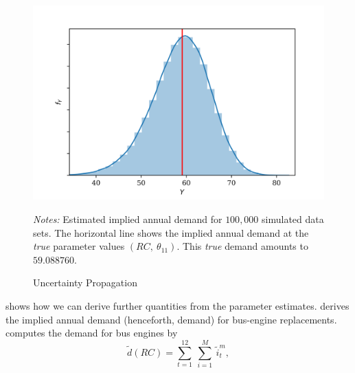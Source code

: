 \begin{figure}[t]
	\caption{Uncertainty Propagation}
    \label{uncertainty}
	\vspace*{-4mm}
	\begin{centering}
		\includegraphics[scale=0.9]{../figures/uncertainty_propagation_100000.png}
	\end{centering}

	\small
	\textit{Notes:} Estimated implied annual demand for $100,000$ simulated data sets. The horizontal line shows the implied annual demand at the \textit{true} parameter values $(RC,\ \theta_{11})$. This \textit{true} demand amounts to $59.088760$.
\end{figure}

\citet{R87} shows how we can derive further quantities from the parameter estimates. \citet{R87} derives the implied annual demand (henceforth, demand) for bus-engine replacements. \citet{R87} computes the demand for bus engines by
\begin{equation}
\tilde{d}(RC)=\sum_{t=1}^{12}\ \sum_{i=1}^{M}\ {\tilde{i}}_t^m,
\end{equation}

